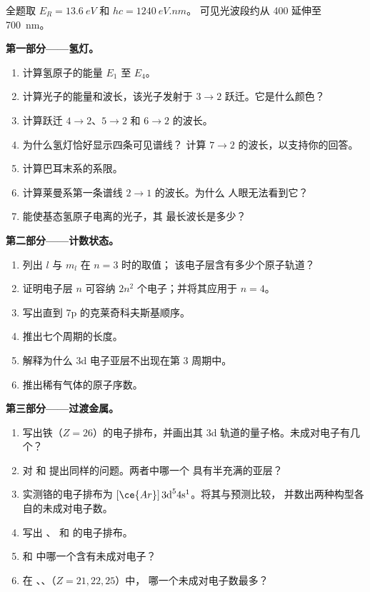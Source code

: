 \begin{problem}
\label{pb:b1:quantum-numbers:1}
全题取 $E_R = \qty{13.6}{eV}$ 和 $hc = \qty{1240}{eV.nm}$。
可见光波段约从 400 延伸至 \qty{700}{nm}。

\medskip
\noindent\textbf{第一部分——氢灯。}
\begin{enumerate}
  \item 计算氢原子的能量 $E_1$ 至 $E_4$。
  \item 计算光子的能量和波长，该光子发射于
        $3 \to 2$ 跃迁。它是什么颜色？
  \item 计算跃迁 $4 \to 2$、$5 \to 2$
        和 $6 \to 2$ 的波长。
  \item 为什么氢灯恰好显示四条可见谱线？
        计算 $7 \to 2$ 的波长，以支持你的回答。
  \item 计算巴耳末系的系限。
  \item 计算莱曼系第一条谱线 $2 \to 1$ 的波长。为什么
        人眼无法看到它？
  \item 能使基态氢原子电离的光子，其
        最长波长是多少？
\end{enumerate}

\medskip
\noindent\textbf{第二部分——计数状态。}
\begin{enumerate}[resume]
  \item 列出 $l$ 与 $m_l$ 在 $n = 3$ 时的取值；
        该电子层含有多少个原子轨道？
  \item 证明电子层 $n$ 可容纳 $2n^2$ 个电子；并将其应用于 $n = 4$。
  \item 写出直到 7p 的克莱奇科夫斯基顺序。
  \item 推出七个周期的长度。
  \item 解释为什么 3d 电子亚层不出现在第 3 周期中。
  \item 推出稀有气体的原子序数。
\end{enumerate}

\medskip
\noindent\textbf{第三部分——过渡金属。}
\begin{enumerate}[resume]
  \item 写出铁（$Z = 26$）的电子排布，并画出其
        3d 轨道的量子格。未成对电子有几个？
  \item 对  和  提出同样的问题。两者中哪一个
        具有半充满的亚层？
  \item 实测铬的电子排布为 $[\ce{Ar}]\,3\text{d}^5
        4\text{s}^1$。将其与预测比较，
        并数出两种构型各自的未成对电子数。
  \item 写出 、 和  的电子排布。
  \item {} 和  中哪一个含有未成对电子？
  \item 在 、、（$Z = 21, 22, 25$）中，
        哪一个未成对电子数最多？
\end{enumerate}


\end{problem}
